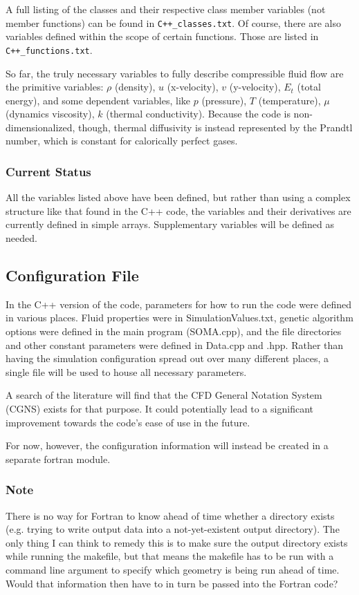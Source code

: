 \documentclass[12pt]{article}
\begin{document}
    A full listing of the classes and their respective class member variables (not member functions) can be found in \texttt{C++\_classes.txt}. Of course, there are also variables defined within the scope of certain functions. Those are listed in \texttt{C++\_functions.txt}.

    So far, the truly necessary variables to fully describe compressible fluid flow are the primitive variables: $\rho$ (density), $u$ (x-velocity), $v$ (y-velocity), $E_t$ (total energy), and some dependent variables, like $p$ (pressure), $T$ (temperature), $\mu$ (dynamics viscosity), $k$ (thermal conductivity). Because the code is non-dimensionalized, though, thermal diffusivity is instead represented by the Prandtl number, which is constant for calorically perfect gases.

    \subsubsection{Current Status}
    All the variables listed above have been defined, but rather than using a complex structure like that found in the C++ code, the variables and their derivatives are currently defined in simple arrays. Supplementary variables will be defined as needed.

    \subsection{Configuration File}
    In the C++ version of the code, parameters for how to run the code were defined in various places. Fluid properties were in SimulationValues.txt, genetic algorithm options were defined in the main program (SOMA.cpp), and the file directories and other constant parameters were defined in Data.cpp and .hpp. Rather than having the simulation configuration spread out over many different places, a single file will be used to house all necessary parameters. 

    A search of the literature will find that the CFD General Notation System (CGNS) exists for that purpose. It could potentially lead to a significant improvement towards the code's ease of use in the future.

    For now, however, the configuration information will instead be created in a separate fortran module.

    \subsubsection{Note}
    There is no way for Fortran to know ahead of time whether a directory exists (e.g. trying to write output data into a not-yet-existent output directory). The only thing I can think to remedy this is to make sure the output directory exists while running the makefile, but that means the makefile has to be run with a command line argument to specify which geometry is being run ahead of time. Would that information then have to in turn be passed into the Fortran code?
    
\end{document}

